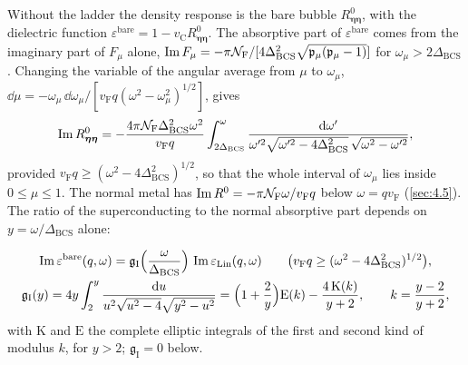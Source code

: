 Without the ladder the density response is the bare bubble $R^0_{\boldsymbol{\eta}\boldsymbol{\eta}}$, with the dielectric function $\varepsilon^{\mathrm{bare}} = 1 - v_{\mathrm{C}}R^0_{\boldsymbol{\eta}\boldsymbol{\eta}}$. The absorptive part of $\varepsilon^{\mathrm{bare}}$ comes from the imaginary part of $F_\mu$ alone, $\operatorname{Im} F_\mu = -\pi\mathcal{N}_{\mathrm{F}}/[4\Delta_{\mathrm{BCS}}^2\sqrt{\mathfrak{p}_\mu(\mathfrak{p}_\mu - 1)}]$ for $\omega_\mu > 2\Delta_{\mathrm{BCS}}$. Changing the variable of the angular average from $\mu$ to $\omega_\mu$, $\dd\mu = -\omega_\mu\,\dd\omega_\mu/[v_{\mathrm{F}}q(\omega^2 - \omega_\mu^2)^{1/2}]$, gives
\begin{equation*}
  \operatorname{Im} R^0_{\boldsymbol{\eta}\boldsymbol{\eta}} = -\frac{4\pi\mathcal{N}_{\mathrm{F}}\Delta_{\mathrm{BCS}}^2\omega^2}{v_{\mathrm{F}}q}\int_{2\Delta_{\mathrm{BCS}}}^{\omega}\frac{\mathrm{d}\omega'}{\omega'^2\sqrt{\omega'^2 - 4\Delta_{\mathrm{BCS}}^2}\,\sqrt{\omega^2 - \omega'^2}} ,
\end{equation*}
provided $v_{\mathrm{F}}q \ge (\omega^2 - 4\Delta_{\mathrm{BCS}}^2)^{1/2}$, so that the whole interval of $\omega_\mu$ lies inside $0 \le \mu \le 1$. The normal metal has $\operatorname{Im} R^0 = -\pi\mathcal{N}_{\mathrm{F}}\omega/v_{\mathrm{F}}q$ below $\omega = qv_{\mathrm{F}}$ (\cref{sec:4.5}). The ratio of the superconducting to the normal absorptive part depends on $y = \omega/\Delta_{\mathrm{BCS}}$ alone:
\begin{keyresult}
\begin{equation}
  \begin{gathered}
  \operatorname{Im}\varepsilon^{\mathrm{bare}}(q,\omega) = \mathfrak{g}_{\mathrm{I}}\Bigl(\frac{\omega}{\Delta_{\mathrm{BCS}}}\Bigr)\,\operatorname{Im}\varepsilon_{\mathrm{Lin}}(q,\omega) \qquad \bigl(v_{\mathrm{F}}q \ge (\omega^2 - 4\Delta_{\mathrm{BCS}}^2)^{1/2}\bigr), \\
  \mathfrak{g}_{\mathrm{I}}(y) = 4y\int_2^y\frac{\mathrm{d} u}{u^2\sqrt{u^2 - 4}\sqrt{y^2 - u^2}} = \Bigl(1 + \frac{2}{y}\Bigr)\mathrm{E}(k) - \frac{4\,\mathrm{K}(k)}{y + 2}, \qquad k = \frac{y - 2}{y + 2} ,
  \end{gathered}
  \label{eq:15.1-gI}
\end{equation}
with $\mathrm{K}$ and $\mathrm{E}$ the complete elliptic integrals of the first and second kind of modulus $k$, for $y > 2$; $\mathfrak{g}_{\mathrm{I}} = 0$ below.
\end{keyresult}
